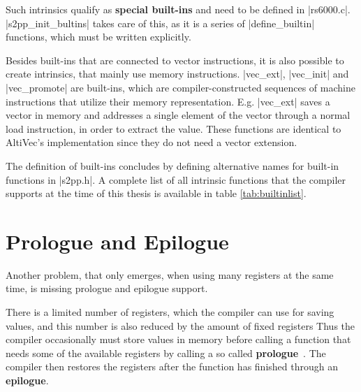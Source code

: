 Such intrinsics qualify as \textbf{special built-ins} and need to be defined in |rs6000.c|.
|s2pp_init_bultins| takes care of this, as it is a series of |define_builtin| functions, which must be written explicitly.

Besides built-ins that are connected to vector instructions, it is also possible to create intrinsics, that mainly use memory instructions.
|vec_ext|, |vec_init| and |vec_promote| are built-ins, which are compiler-constructed sequences of machine instructions that utilize their memory representation.
E.g. |vec_ext| saves a vector in memory and addresses a single element of the vector through a normal load instruction, in order to extract the value.
These functions are identical to AltiVec's implementation since they do not need a vector extension.

The definition of built-ins concludes by defining alternative names for built-in functions in |s2pp.h|.
A complete list of all intrinsic functions that the compiler supports at the time of this thesis is available in table \ref{tab:builtinlist}.

\section{Prologue and Epilogue}
Another problem, that only emerges, when using many registers at the same time, is missing prologue and epilogue support.

There is a limited number of registers, which the compiler can use for saving values, and this number is also reduced by the amount of fixed registers
Thus the compiler occasionally must store values in memory before calling a function that needs some of the available registers by calling a so called \textbf{prologue}~\citep[ch.~17.9.11]{GCCint}.
The compiler then restores the registers after the function has finished through an \textbf{epilogue}.

